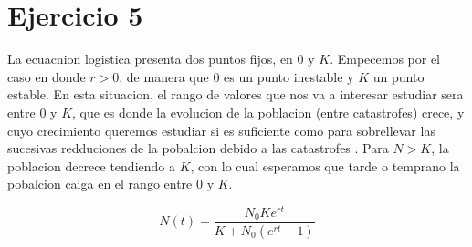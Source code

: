 \section*{Ejercicio 5}
\graphicspath{{Figuras/ej_05/}}

La ecuacnion logistica presenta dos puntos fijos, en $0$ y $K$.
Empecemos por el caso en donde $r > 0$, de manera que $0$ es un punto inestable y $K$ un punto estable. En esta situacion, el rango de valores que nos va a interesar estudiar sera entre 0 y $K$, que es donde la evolucion de la poblacion (entre catastrofes) crece, y cuyo crecimiento queremos estudiar si es suficiente como para sobrellevar las sucesivas redduciones de la pobalcion debido a las catastrofes . Para $N > K$, la poblacion decrece tendiendo a $K$, con lo cual esperamos que tarde o temprano la pobalcion caiga en el rango entre $0$ y $K$.

\begin{equation}
    N(t) = \frac{N_{0} K e^{rt}}{K+N_{0}(e^{rt}-1)}
    \label{eq:Logistica_Sol_Exacta}
\end{equation}

